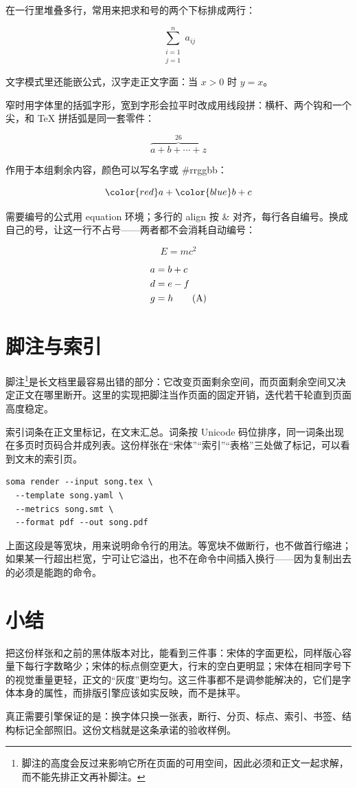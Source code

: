 \documentclass{article}
\begin{document}
\substack 在一行里堆叠多行，常用来把求和号的两个下标排成两行：

\[
\sum_{\substack{i=1\\j=1}}^{n} a_{ij}
\]

文字模式里还能嵌公式，汉字走正文字面：$\text{当 }x>0\text{ 时 }y=x$。

\overbrace 窄时用字体里的括弧字形，宽到字形会拉平时改成用线段拼：横杆、两个钩和一个尖，和 TeX 拼括弧是同一套零件：

\[
\overbrace{a+b+\cdots+z}^{26}
\]

\color 作用于本组剩余内容，颜色可以写名字或 #rrggbb：

\[
\color{red} a + \color{blue} b + c
\]

需要编号的公式用 equation 环境；多行的 align 按 \& 对齐，每行各自编号。\tag 换成自己的号，\notag 让这一行不占号——两者都不会消耗自动编号：

\begin{equation}
E = mc^2
\end{equation}

\begin{align}
a &= b + c \\
d &= e - f \notag \\
g &= h \tag{A}
\end{align}

\section{脚注与索引}

脚注\footnote{脚注的高度会反过来影响它所在页面的可用空间，因此必须和正文一起求解，而不能先排正文再补脚注。}是长文档里最容易出错的部分：它改变页面剩余空间，而页面剩余空间又决定正文在哪里断开。这里的实现把脚注当作页面的固定开销，迭代若干轮直到页面高度稳定。

索引词条在正文里标记，在文末汇总。词条按 Unicode 码位排序，同一词条出现在多页时页码合并成列表。这份样张在“宋体”“索引”“表格”三处做了标记，可以看到文末的索引页。

\begin{verbatim}
soma render --input song.tex \
  --template song.yaml \
  --metrics song.smt \
  --format pdf --out song.pdf
\end{verbatim}

上面这段是等宽块，用来说明命令行的用法。等宽块不做断行，也不做首行缩进；如果某一行超出栏宽，宁可让它溢出，也不在命令中间插入换行——因为复制出去的必须是能跑的命令。

\section{小结}

把这份样张和之前的黑体版本对比，能看到三件事：宋体的字面更松，同样版心容量下每行字数略少；宋体的标点侧空更大，行末的空白更明显；宋体在相同字号下的视觉重量更轻，正文的“灰度”更均匀。这三件事都不是调参能解决的，它们是字体本身的属性，而排版引擎应该如实反映，而不是抹平。

真正需要引擎保证的是：换字体只换一张表，断行、分页、标点、索引、书签、结构标记全部照旧。这份文档就是这条承诺的验收样例。
\end{document}
